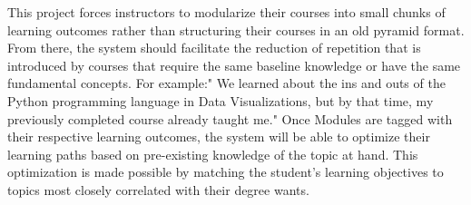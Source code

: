 This project forces instructors to modularize their courses into small chunks of learning outcomes rather than structuring their courses in an old pyramid format. From there, the system should facilitate the reduction of repetition that is introduced by courses that require the same baseline knowledge or have the same fundamental concepts. For example:" We learned about the ins and outs of the Python programming language in Data Visualizations, but by that time, my previously completed course already taught me." Once Modules are tagged with their respective learning outcomes, the system will be able to optimize their learning paths based on pre-existing knowledge of the topic at hand. This optimization is made possible by matching the student's learning objectives to topics most closely correlated with their degree wants.